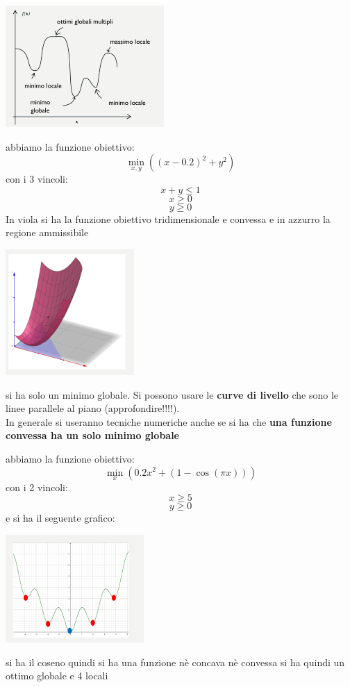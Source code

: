 \documentclass[a4paper,12pt, oneside]{book}
\begin{document}
\begin{center}
  \includegraphics[scale = 1.3]{img/opt.png}
\end{center}
\newpage
\begin{esempio}
  abbiamo la funzione obiettivo:
  \[\min_{x,y}((x-0.2)^2+y^2)\]
  con i 3 vincoli:
  \[x+y \leq 1\]
  \[x\geq 0\]
  \[y\geq 0\]
  In viola si ha la funzione obiettivo tridimensionale e convessa
  e in azzurro la regione ammissibile
  \begin{center}
    \includegraphics[scale = 1.3]{img/optes.png}
  \end{center}
  si ha solo un minimo globale.
  Si possono usare le \textbf{curve di livello} che sono le linee
  parallele al piano (approfondire!!!!).\\
  In generale si useranno tecniche numeriche anche se si ha che
  \textbf{una funzione convessa ha un solo minimo globale}
\end{esempio}
\newpage
\begin{esempio}
  abbiamo la funzione obiettivo:
  \[\min_{x}(0.2x^2+(1-\cos(\pi x)))\]
  con i 2 vincoli:
  \[x\geq 5\]
  \[y\geq 0\]
  e si ha il seguente grafico:
  \begin{center}
    \includegraphics[scale = 1.3]{img/optes2.png}
  \end{center}
  si ha il coseno quindi si ha una funzione nè concava nè convessa
  si ha quindi un ottimo globale e 4 locali
\end{esempio}
\end{document}
